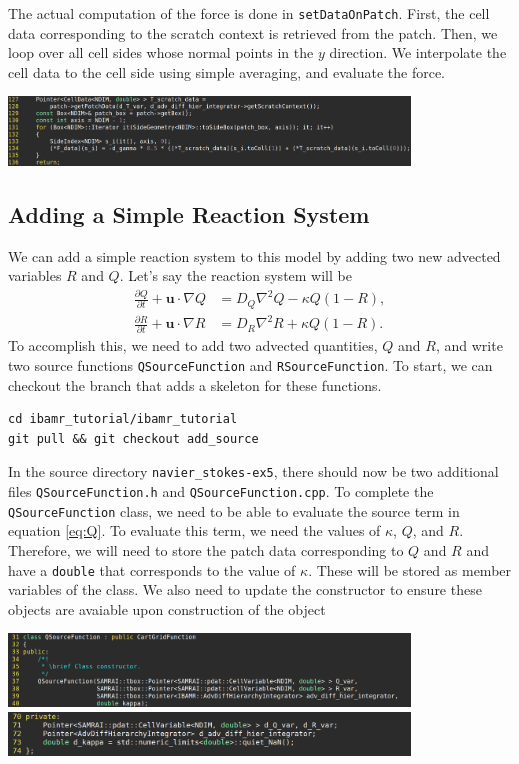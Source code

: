 \documentclass{article}
\newcommand{\bu}{\mathbf{u}}
\newcommand{\grad}{\nabla}
\newcommand{\Lap}{\nabla^2}
\begin{document}
The actual computation of the force is done in \verb|setDataOnPatch|. First, the cell data corresponding to the scratch context is retrieved from the patch. Then, we loop over all cell sides whose normal points in the $y$ direction. We interpolate the cell data to the cell side using simple averaging, and evaluate the force.
\begin{center}
\includegraphics[width=0.8\textwidth]{Graphs/NS-ex5/Boussinesq_setDataOnPatch.png}
\end{center}

\subsection{Adding a Simple Reaction System}
We can add a simple reaction system to this model by adding two new advected variables $R$ and $Q$. Let's say the reaction system will be
\begin{align}
\frac{\partial Q}{\partial t} + \bu\cdot\grad Q &= D_Q \Lap Q - \kappa Q(1 - R), \label{eq:Q}\\
\frac{\partial R}{\partial t} + \bu\cdot\grad R &= D_R \Lap R + \kappa Q(1 - R). \label{eq:R}
\end{align}
To accomplish this, we need to add two advected quantities, $Q$ and $R$, and write two source functions \verb|QSourceFunction| and \verb|RSourceFunction|. To start, we can checkout the branch that adds a skeleton for these functions.
\begin{verbatim}
cd ibamr_tutorial/ibamr_tutorial
git pull && git checkout add_source
\end{verbatim}
In the source directory \verb|navier_stokes-ex5|, there should now be two additional files \verb|QSourceFunction.h| and \verb|QSourceFunction.cpp|. To complete the \verb|QSourceFunction| class, we need to be able to evaluate the source term in equation \eqref{eq:Q}. To evaluate this term, we need the values of $\kappa$, $Q$, and $R$. Therefore, we will need to store the patch data corresponding to $Q$ and $R$ and have a \verb|double| that corresponds to the value of $\kappa$. These will be stored as member variables of the class. We also need to update the constructor to ensure these objects are avaiable upon construction of the object
\begin{center}
\includegraphics[width=0.8\textwidth]{Graphs/NS-ex5/add_src/header_update_constructor.png} \\
\vspace{0.5em}
\includegraphics[width=0.8\textwidth]{Graphs/NS-ex5/add_src/header_update_member_vars.png}
\end{center}
\end{document}
